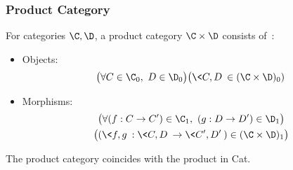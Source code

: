 \subsubsection{Product Category}
\begin{definition}

  For categories $\C,\D$, a product category $\C\times \D$ consists
  of~\parencite[p.~16]{awodey:category_theory}:

  \begin{itemize}
    \item Objects:
      \[\big(\forall C \in \C_0,\ D \in \D_0\big)
        \big(\<C, D\>\in (\C\times \D)_0)\]
    \item Morphisms:
      \[
        \begin{gathered}
          \big(\forall (f: C \to C')\in \C_1,\ (g:D \to D')\in \D_1\big)\\
          \big((\<f,g\> : \<C,D\> \to \<C', D'\>)\in (\C\times \D)_1\big)
        \end{gathered}
      \]
  \end{itemize}
\end{definition}

\begin{remark}
  The product category coincides with the product in Cat.
\end{remark}

